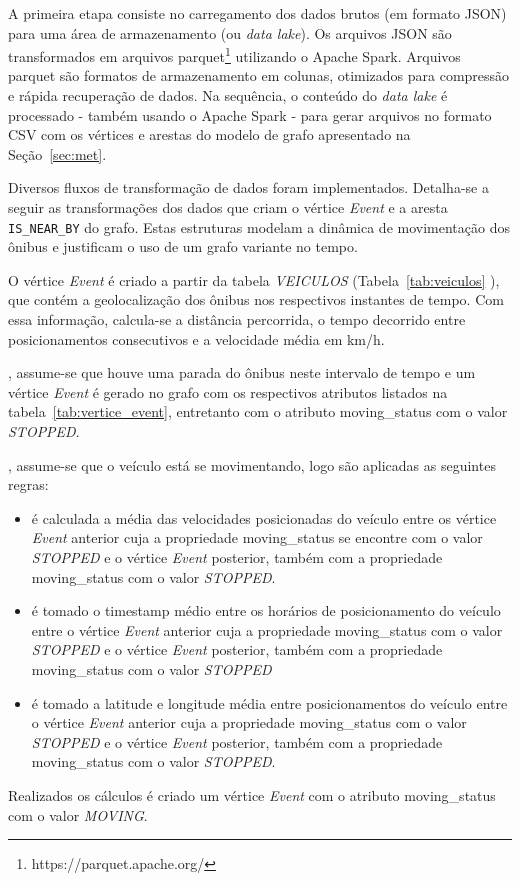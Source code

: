  
A primeira etapa consiste no carregamento dos dados brutos (em formato JSON) para uma área de armazenamento (ou \emph{data lake}). Os arquivos JSON são transformados em arquivos parquet\footnote{https://parquet.apache.org/} \cite{Boufea:17} utilizando o Apache Spark. Arquivos parquet são formatos de armazenamento em colunas, otimizados para compressão e rápida recuperação de dados. 
Na sequência, o conteúdo do \emph{data lake} é processado - também usando o Apache Spark - para gerar arquivos no formato CSV com os vértices e arestas do modelo de grafo apresentado na Seção~\ref{sec:met}. 

Diversos fluxos de transformação de dados foram implementados. Detalha-se a seguir as transformações dos dados que criam o vértice \emph{Event} e a aresta \texttt{IS\_NEAR\_BY} do grafo. Estas estruturas modelam a dinâmica de movimentação dos ônibus e justificam o uso de um grafo variante no tempo.

O vértice \emph{Event} é criado a partir da tabela \emph{VEICULOS} (Tabela~\ref{tab:veiculos} ), que contém a geolocalização dos ônibus nos respectivos instantes de tempo. Com essa informação, calcula-se a distância percorrida, o tempo decorrido entre posicionamentos consecutivos e a velocidade média em km/h.


, assume-se que houve uma parada do ônibus neste intervalo de tempo e um vértice \emph{Event} é gerado no grafo com os respectivos atributos listados na tabela~\ref{tab:vertice_event}, entretanto com o atributo moving\_status com o valor \emph{STOPPED}.

, assume-se que o veículo está se movimentando, logo são aplicadas as seguintes regras:
 \begin{itemize}
     \item é calculada a média das velocidades posicionadas do veículo entre os vértice \emph{Event} anterior cuja a propriedade moving\_status se encontre com o valor \emph{STOPPED} e o vértice \emph{Event} posterior, também com a propriedade moving\_status com o valor \emph{STOPPED}.
     
     \item é tomado o timestamp médio entre os horários de posicionamento do veículo entre o vértice \emph{Event} anterior cuja a propriedade moving\_status com o valor \emph{STOPPED} e o vértice \emph{Event} posterior, também com a propriedade moving\_status com o valor \emph{STOPPED}
     
     \item é tomado a latitude e longitude média entre posicionamentos do veículo entre o vértice \emph{Event} anterior cuja a propriedade moving\_status  com o valor \emph{STOPPED}  e o vértice \emph{Event} posterior, também com a propriedade moving\_status com o valor \emph{STOPPED}.
     
 \end{itemize}
 Realizados os cálculos é criado um vértice \emph{Event} com o atributo moving\_status com o valor \emph{MOVING}.


